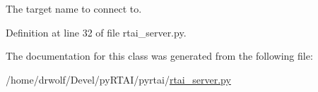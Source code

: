 \-The target name to connect to. 



\-Definition at line 32 of file rtai\-\_\-server.\-py.



\-The documentation for this class was generated from the following file\-:\begin{DoxyCompactItemize}
\item 
/home/drwolf/\-Devel/py\-R\-T\-A\-I/pyrtai/\hyperlink{rtai__server_8py}{rtai\-\_\-server.\-py}\end{DoxyCompactItemize}
